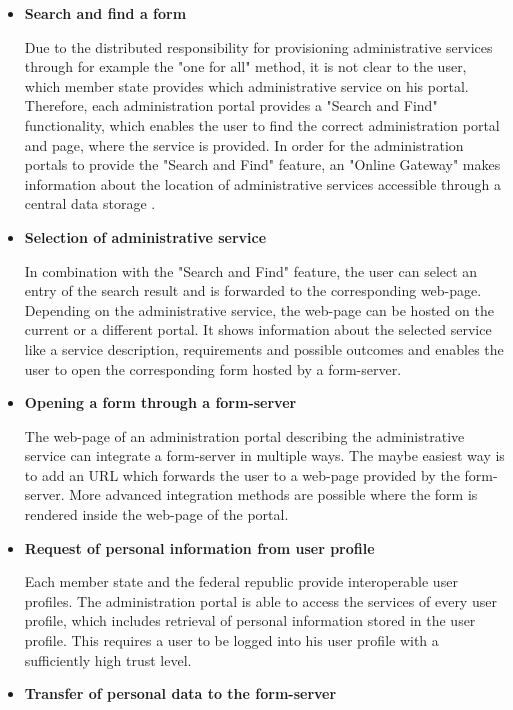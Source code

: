 \documentclass[
     12pt,         %
     a4paper,      %
     BCOR=10mm,version=first,     %
     DIV=14,version=first,        %
     ]{scrreprt}
\begin{document}
\begin{itemize}
    \item \textbf{Search and find a form}
    
    Due to the distributed responsibility for provisioning administrative services through for example the "one for all" method, it is not clear to the user, which member state provides which administrative service on his portal. Therefore, each administration portal provides a "Search and Find" functionality, which enables the user to find the correct administration portal and page, where the service is provided. In order for the administration portals to provide the "Search and Find" feature, an "Online Gateway" makes information about the location of administrative services accessible through a central data storage \cite{Capgemini:OnlineGateway}.
    
    \item \textbf{Selection of administrative service}
    
    In combination with the "Search and Find" feature, the user can select an entry of the search result and is forwarded to the corresponding web-page. Depending on the administrative service, the web-page can be hosted on the current or a different portal. It shows information about the selected service like a service description, requirements and possible outcomes and enables the user to open the corresponding form hosted by a form-server.
    
    \item \textbf{Opening a form through a form-server}
    
    The web-page of an administration portal describing the administrative service can integrate a form-server in multiple ways. The maybe easiest way is to add an URL which forwards the user to a web-page provided by the form-server. More advanced integration methods are possible where the form is rendered inside the web-page of the portal.
    
    \item \textbf{Request of personal information from user profile}
    
    Each member state and the federal republic provide interoperable user profiles. The administration portal is able to access the services of every user profile, which includes retrieval of personal information stored in the user profile. This requires a user to be logged into his user profile with a sufficiently high trust level.
    
    \item \textbf{Transfer of personal data to the form-server}
    

\end{itemize}
\end{document}
